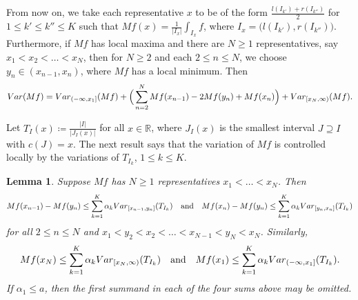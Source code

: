 \documentclass[leqno,11pt]{amsart}
\numberwithin{equation}{section}
\numberwithin{theorem}{section}
\newtheorem{lemma}[theorem]{Lemma}
\newcommand{\Var}{{\rm Var}}
\begin{document}
	From now on, we take each representative $x$ to be of the form $\frac{l(I_{k'}) + r(I_{k''})}{2}$ for  
	$1\le k' \leq k''\le K$ such that $Mf(x) = \frac{1}{|I_x|} \int_{I_x} f$, where $I_x = \big(l(I_{k'}), r(I_{k''})\big)$. 
	Furthermore, if $Mf$ has local maxima and there are $N\ge1$ representatives, say $x_1<x_2<\dots< x_N$, then for  $N\ge2$ and each $2\le n\le N$, 
	we choose $y_n\in (x_{n-1},x_{n})$, where $Mf$ has a local minimum. Then
	\begin{align} \label{var-split}
	\Var (Mf) = \Var_{(-\infty, x_1]}(Mf) + \Big( \sum_{n=2}^N Mf(x_{n-1}) - 2Mf(y_n) + Mf(x_{n}) \Big) + \Var_{[x_N,\infty)}(Mf).
	\end{align}
	
	Let $T_I(x) \coloneqq \frac{|I|}{|J_I(x)|}$ for all $x\in\mathbb{R}$, where $J_I(x)$ is the smallest interval $J \supseteq I$ with $c(J)=x$. 
	The next result says that the variation of $Mf$ is controlled locally by the variations of $T_{I_k}$, $1 \leq k \leq K$.
	 
	\begin{lemma} \label{L3}
		Suppose $Mf$ has $N\ge1$ representatives $x_1 < \dots < x_N$.  
		Then
		\begin{align*}
		Mf(x_{n-1}) - Mf(y_{n}) \leq \sum_{k=1}^K \alpha_k \Var_{[x_{n-1},y_{n}]} (T_{I_k}) 
		\quad \text{and} \quad 
		Mf(x_n) - Mf(y_n) \leq \sum_{k=1}^K \alpha_k \Var_{[y_n, x_n]} (T_{I_k}) 
		\end{align*}
		for all $2\le n \le N$ and $x_1<y_2<x_2<\dots<x_{N-1}<y_N<x_N$. Similarly,
		\begin{align*}
		Mf(x_{N}) \leq \sum_{k=1}^K \alpha_k \Var_{[x_{N},\infty)} (T_{I_k}) 
		\quad \text{and} \quad 
		Mf(x_1) \leq \sum_{k=1}^K \alpha_k \Var_{(-\infty, x_1]} (T_{I_k}). 
		\end{align*}
		If $\alpha_1 \leq a$, then the first summand in each of the four sums above may be omitted.   
	\end{lemma}  
	
\end{document}
